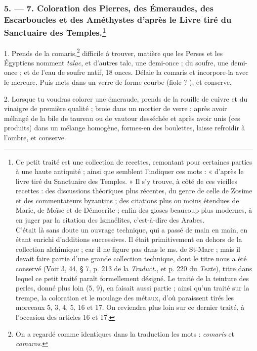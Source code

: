 \documentclass[a4paper, 11pt, oneside, polutonikogreek, french]{article}
\begin{document}
\subsubsection[5. --- 7. Coloration des Pierres, des Émeraudes, des Escarboucles et des Améthystes d'après le Livre tiré du Sanctuaire des Temples.]{5. --- 7. Coloration des Pierres, des Émeraudes, des Escarboucles et des Améthystes d'après le Livre tiré du Sanctuaire des Temples.\footnote{Ce petit traité est une collection de recettes, remontant pour certaines parties à une haute antiquité ; ainsi que semblent l'indiquer ces mots : « d'après le livre tiré du Sanctuaire des Temples. » Il s'y trouve, à côté de ces vieilles recettes : des discussions théoriques plus récentes, du genre de celle de Zosime et des commentateurs byzantins ; des citations plus ou moins étendues de Marie, de Moïse et de Démocrite ; enfin des gloses beaucoup plus modernes, à en juger par la citation des Ismaélites, c'est-à-dire des Arabes.\\\hspace*{5mm}C'était là sans doute un ouvrage technique, qui a passé de main en main, en étant enrichi d'additions successives. Il était primitivement en dehors de la collection alchimique ; car il ne figure pas dans le ms. de St-Marc ; mais il devait faire partie d'une grande collection technique, dont le titre nous a été conservé (Voir 3, 44, § 7, p. 213 de la \emph{Traduct.}, et p. 220 du \emph{Texte}), titre dans lequel ce petit traité paraît formellement désigné. Le traité de la teinture des perles, donné plus loin (5, 9), en faisait aussi partie ; ainsi qu'un traité sur la trempe, la coloration et le moulage des métaux, d'où paraissent tirés les morceaux 5, 3, 4, 5, 16 et 17. On reviendra plus loin sur ce dernier traité, à l'occasion des articles 16 et 17.}}

1. Prends de la comaris,\footnote{On a regardé comme identiques dans la traduction les mots : \emph{comaris} et \emph{comaros}.} difficile à trouver, matière que les Perses et les Égyptiens nomment \emph{talac}, et d'autres talc, une demi-once ; du soufre, une demi-once ; et de l'eau de soufre natif, 18 onces. Délaie la comaris et incorpore-la avec le mercure. Puis mets dans un verre de forme courbe (fiole ? ), et conserve.

2. Lorsque tu voudras colorer une émeraude, prends de la rouille de cuivre et du vinaigre de première qualité ; broie dans un mortier de verre ; après avoir mélangé de la bile de taureau ou de vautour desséchée et après avoir unis (ces produits) dans un mélange homogène, formes-en des boulettes, laisse refroidir à l'ombre, et conserve.
\end{document}
